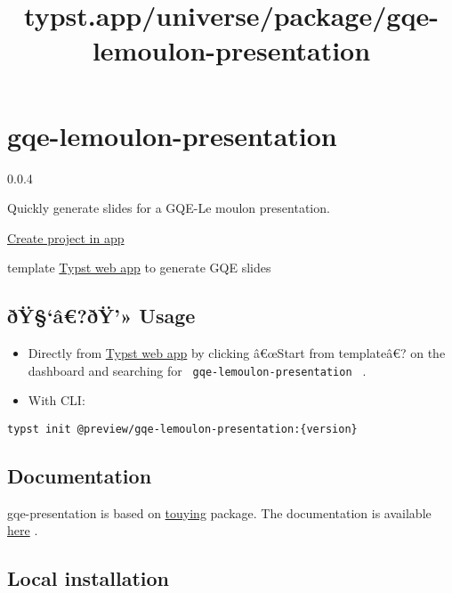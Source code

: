 \title{typst.app/universe/package/gqe-lemoulon-presentation}

\label{banner}
\label{template-thumbnail}

\section{gqe-lemoulon-presentation}\label{gqe-lemoulon-presentation}

{ 0.0.4 }

Quickly generate slides for a GQE-Le moulon presentation.

\href{/app?template=gqe-lemoulon-presentation&version=0.0.4}{Create
project in app}

\label{readme}
template \href{https://typst.app/}{Typst web app} to generate GQE slides

\subsection{ðŸ§`â€?ðŸ'» Usage}\label{uxf0uxffuxe2uxf0uxff-usage}

\begin{itemize}
\item
  Directly from \href{https://typst.app/}{Typst web app} by clicking
  â€œStart from templateâ€? on the dashboard and searching for
  \texttt{\ gqe-lemoulon-presentation\ } .
\item
  With CLI:
\end{itemize}

\begin{verbatim}
typst init @preview/gqe-lemoulon-presentation:{version}
\end{verbatim}

\subsection{Documentation}\label{documentation}

gqe-presentation is based on
\href{https://touying-typ.github.io/}{touying} package. The
documentation is available \href{https://touying-typ.github.io/}{here} .

\subsection{Local installation}\label{local-installation}

